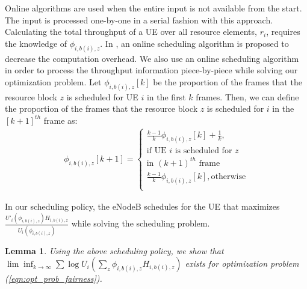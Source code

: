 \documentclass[conference]{IEEEtran}
\newtheorem{lem}[thm]{Lemma}
\begin{document}
Online algorithms are used when the entire input is not available from the start. The input is processed one-by-one in a serial fashion with this approach. Calculating the total throughput of a UE over all resource elements, $r_i$, requires the knowledge of $\phi_{i,b(i),z}$. In \cite{SelfOrganizedLTE}, an online scheduling algorithm is proposed to decrease the computation overhead. We also use an online scheduling algorithm in order to process the throughput information piece-by-piece while solving our optimization problem.
Let $\phi_{i,b(i),z}[k]$ be the proportion of the frames that the resource block $z$ is scheduled for UE $i$ in the first $k$ frames. Then, we can define the proportion of the frames that the resource block $z$ is scheduled for $i$ in the $[k+1]^{th}$ frame as:
\begin{equation*}\label{eqn:online_algorithm}
\begin{aligned}
\phi_{i,b(i),z}[k+1]=
\begin{cases}
	\frac{k-1}{k}\phi_{i,b(i),z}[k]+\frac{1}{k},\\ 
	\text{if UE $i$ is scheduled for $z$}\\
	\text{in $(k+1)^{th}$ frame}\\
	\frac{k-1}{k}\phi_{i,b(i),z}[k],\text{otherwise}\\
\end{cases}
\end{aligned}
\end{equation*}


In our scheduling policy, the eNodeB schedules for the UE that maximizes $\frac{U'_i(\phi_{i,b(i),z})H_{i,b(i),z}}{U_i(\phi_{i,b(i),z})}$ while solving the scheduling problem.\\      

\begin{lem}\label{lem:optimality}  Using the above scheduling policy, we show that $\lim \inf_{k \rightarrow \infty} \sum \log U_i(\sum_z\phi_{i,b(i),z}H_{i,b(i),z})$ exists for optimization problem (\ref{eqn:opt_prob_fairness}).
\end{lem}
\end{document}

